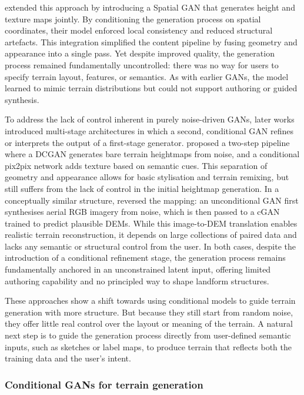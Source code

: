 \cite{Spick2019} extended this approach by introducing a Spatial GAN that generates height and texture maps jointly. By conditioning the generation process on spatial coordinates, their model enforced local consistency and reduced structural artefacts. This integration simplified the content pipeline by fusing geometry and appearance into a single pass. Yet despite improved quality, the generation process remained fundamentally uncontrolled: there was no way for users to specify terrain layout, features, or semantics. As with earlier GANs, the model learned to mimic terrain distributions but could not support authoring or guided synthesis.

To address the lack of control inherent in purely noise-driven GANs, later works introduced multi-stage architectures in which a second, conditional GAN refines or interprets the output of a first-stage generator. \cite{Beckham2017} proposed a two-step pipeline where a DCGAN generates bare terrain heightmaps from noise, and a conditional pix2pix network adds texture based on semantic cues. This separation of geometry and appearance allows for basic stylisation and terrain remixing, but still suffers from the lack of control in the initial heightmap generation. In a conceptually similar structure, \cite{Panagiotou2020} reversed the mapping: an unconditional GAN first synthesises aerial RGB imagery from noise, which is then passed to a cGAN trained to predict plausible DEMs. While this image-to-DEM translation enables realistic terrain reconstruction, it depends on large collections of paired data and lacks any semantic or structural control from the user. In both cases, despite the introduction of a conditional refinement stage, the generation process remains fundamentally anchored in an unconstrained latent input, offering limited authoring capability and no principled way to shape landform structures.

These approaches show a shift towards using conditional models to guide terrain generation with more structure. But because they still start from random noise, they offer little real control over the layout or meaning of the terrain. A natural next step is to guide the generation process directly from user-defined semantic inputs, such as sketches or label maps, to produce terrain that reflects both the training data and the user's intent.


\subsubsection{Conditional GANs for terrain generation}
\label{sec:coral-island-sota-cGAN}

